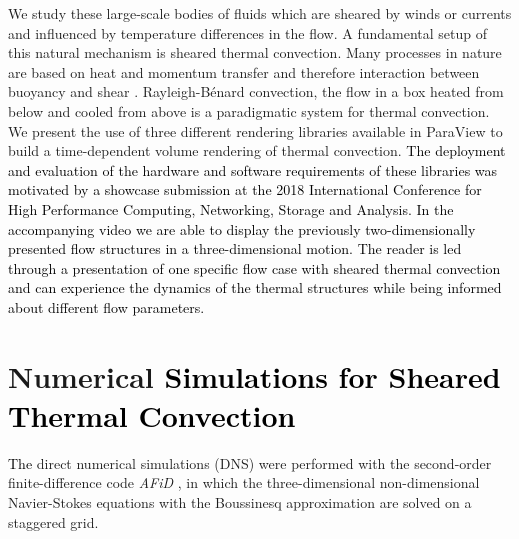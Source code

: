 \documentclass[5p,times]{elsarticle}
\begin{document}
We study these large-scale bodies of fluids which are sheared by winds or currents and influenced by temperature differences in the flow. A fundamental setup of this natural mechanism is sheared thermal convection. Many processes in nature are based on heat and momentum transfer and therefore interaction between buoyancy \cite{ahl09,loh10} and shear \cite{smi11,bar07}. Rayleigh-B\'enard convection, the flow in a box heated from below and cooled from above is a paradigmatic system for thermal convection. We present the use of three different rendering libraries available in ParaView \cite{Ahrens2005} to build a time-dependent volume rendering of thermal convection. \textcolor{black}{The deployment and evaluation of the hardware and software requirements of these libraries was motivated by a showcase submission at the 2018 International Conference for High Performance Computing, Networking, Storage and Analysis. In the accompanying video \cite{fav18} we are able to display the previously two-dimensionally presented flow structures in a three-dimensional motion. The reader is led through a presentation of one specific flow case with sheared thermal convection and can experience the dynamics of the thermal structures while being informed about different flow parameters.} 

\section{Numerical \textcolor{black}{Simulations for Sheared Thermal Convection}}
\textcolor{black}{The} direct numerical simulations (DNS) were performed with the second-order finite-difference
code \textit{AFiD} \cite{poe15c}, in which the three-dimensional non-dimensional
Navier-Stokes equations with the Boussinesq approximation are solved on a staggered grid.

%
%
\end{document}
